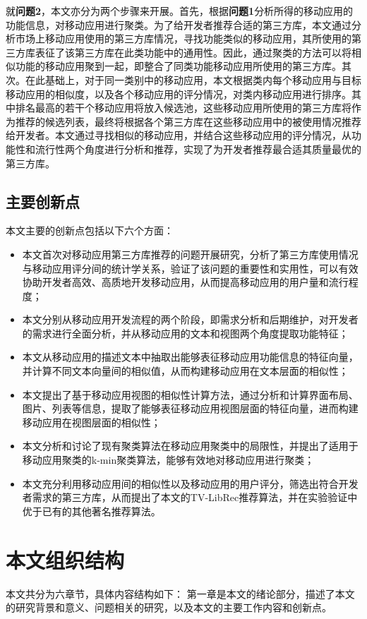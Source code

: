 就\textbf{问题2}，本文亦分为两个步骤来开展。首先，根据\textbf{问题1}分析所得的移动应用的功能信息，对移动应用进行聚类。为了给开发者推荐合适的第三方库，本文通过分析市场上移动应用使用的第三方库情况，寻找功能类似的移动应用，其所使用的第三方库表征了该第三方库在此类功能中的通用性。因此，通过聚类的方法可以将相似功能的移动应用聚到一起，即整合了同类功能移动应用所使用的第三方库。其次。在此基础上，对于同一类别中的移动应用，本文根据类内每个移动应用与目标移动应用的相似度，以及各个移动应用的评分情况，对类内移动应用进行排序。其中排名最高的若干个移动应用将放入候选池，这些移动应用所使用的第三方库将作为推荐的候选列表，最终将根据各个第三方库在这些移动应用中的被使用情况推荐给开发者。本文通过寻找相似的移动应用，并结合这些移动应用的评分情况，从功能性和流行性两个角度进行分析和推荐，实现了为开发者推荐最合适其质量最优的第三方库。


\subsection{主要创新点}
本文主要的创新点包括以下六个方面：
\begin{itemize}%
\item
本文首次对移动应用第三方库推荐的问题开展研究，分析了第三方库使用情况与移动应用评分间的统计学关系，验证了该问题的重要性和实用性，可以有效协助开发者高效、高质地开发移动应用，从而提高移动应用的用户量和流行程度；

\item
本文分别从移动应用开发流程的两个阶段，即需求分析和后期维护，对开发者的需求进行全面分析，并从移动应用的文本和视图两个角度提取功能特征；

\item
本文从移动应用的描述文本中抽取出能够表征移动应用功能信息的特征向量，并计算不同文本向量间的相似值，从而构建移动应用在文本层面的相似性；

\item
本文提出了基于移动应用视图的相似性计算方法，通过分析和计算界面布局、图片、列表等信息，提取了能够表征移动应用视图层面的特征向量，进而构建移动应用在视图层面的相似性；

\item
本文分析和讨论了现有聚类算法在移动应用聚类中的局限性，并提出了适用于移动应用聚类的k-min聚类算法，能够有效地对移动应用进行聚类；

\item
本文充分利用移动应用间的相似性以及移动应用的用户评分，筛选出符合开发者需求的第三方库，从而提出了本文的TV-LibRec推荐算法，并在实验验证中优于已有的其他著名推荐算法。
\end{itemize}



\section{本文组织结构}

本文共分为六章节，具体内容结构如下：
第一章是本文的绪论部分，描述了本文的研究背景和意义、问题相关的研究，以及本文的主要工作内容和创新点。
